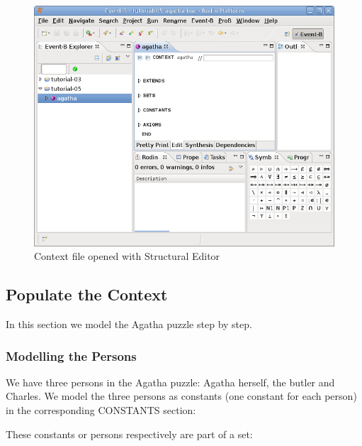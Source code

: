 \begin{figure}[!h]
\begin{center}
	\includegraphics{img/tutorial/tut_05_agatha2.png}
	\caption{Context file opened with Structural Editor}
	\label{fig_tut_05_context_file}
\end{center}
\end{figure}

\subsection{Populate the Context}

In this section we model the Agatha puzzle step by step.

\subsubsection{Modelling the Persons}
\label{tut_modelling_the_persons}

We have three persons in the Agatha puzzle: Agatha herself, the butler and Charles. We model the three persons as constants (one constant for each person) in the corresponding \textsf{CONSTANTS} section:


These constants or persons respectively are part of a set:

